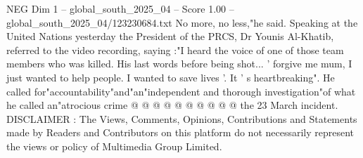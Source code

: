 \begin{textsample}{NEG Dim 1 – global\_south\_2025\_04 – Score 1.00 – global\_south\_2025\_04/123230684.txt}
No more, no less,"he said.
Speaking at the United Nations yesterday the President of the PRCS, Dr Younis Al-Khatib, referred to the video recording, saying :"I heard the voice of one of those team members who was killed.
His last words before being shot... ' forgive me mum, I just wanted to help people.
I wanted to save lives '.
It ' s heartbreaking".
He called for"accountability"and"an"independent and thorough investigation"of what he called an"atrocious crime @ @ @ @ @ @ @ @ @ @ the 23 March incident.
DISCLAIMER : The Views, Comments, Opinions, Contributions and Statements made by Readers and Contributors on this platform do not necessarily represent the views or policy of Multimedia Group Limited.

\end{textsample}
